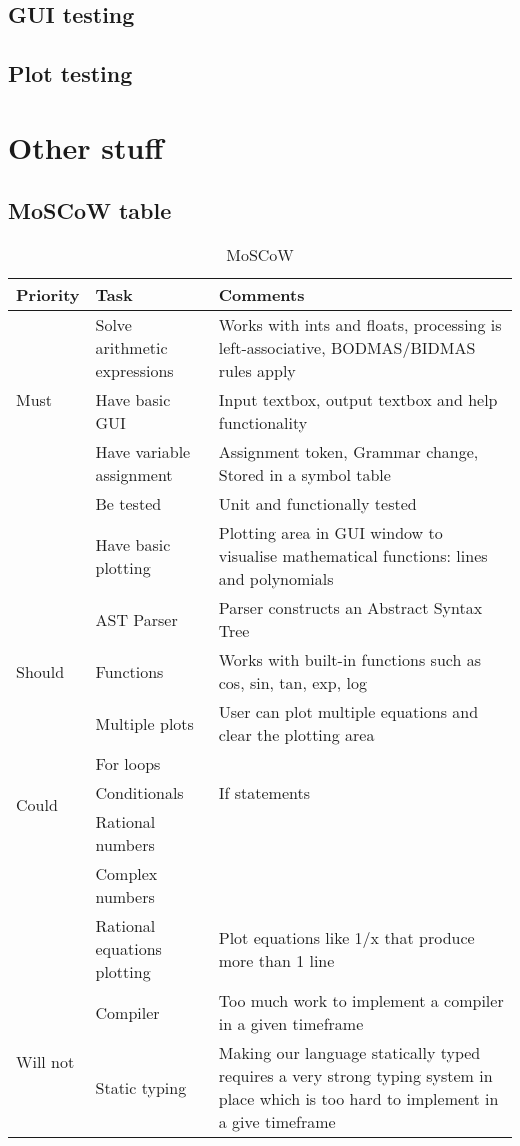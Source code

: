 \documentclass[a4paper, oneside, 11pt]{report}
\begin{document}
\section{GUI testing}

\section{Plot testing}

\chapter{Other stuff}
\section{MoSCoW table}
\label{appendix:moscow}
\begin{table}[h]
\caption{MoSCoW}
\begin{center}
\begin{tabular}{|p{1in}|p{2in}|p{2.5in}|} \hline
Priority & Task & Comments \\ \hline \hline
\multirow{3}{1in}{Must}
& Solve arithmetic expressions & Works with ints and floats, processing is left-associative, BODMAS/BIDMAS rules apply \\ \cline{2-3}
& Have basic GUI & Input textbox, output textbox and help functionality \\ \cline{2-3}
& Have variable assignment & Assignment token, Grammar change, Stored in a symbol table \\ \cline{2-3}
& Be tested & Unit and functionally tested \\ \cline{2-3}
& Have basic plotting & Plotting area in GUI window to visualise mathematical functions: lines and polynomials \\ \hline \hline
\multirow{3}{1in}{Should}
& AST Parser & Parser constructs an Abstract Syntax Tree \\ \cline{2-3}
& Functions & Works with built-in functions such as cos, sin, tan, exp, log  \\ \cline{2-3}
& Multiple plots & User can plot multiple equations and clear the plotting area \\ \hline \hline
\multirow{3}{1in}{Could}
& For loops & \\ \cline{2-3}
& Conditionals & If statements \\ \cline{2-3}
& Rational numbers & \\ \cline{2-3}
& Complex numbers & \\ \cline{2-3}
& Rational equations plotting & Plot equations like 1/x that produce more than 1 line \\ \hline \hline
\multirow{3}{1in}{Will not}
& Compiler & Too much work to implement a compiler in a given timeframe \\ \cline{2-3}
& Static typing & Making our language statically typed requires a very strong typing system in place which is too hard to implement in a give timeframe \\ \hline
\end{tabular}
\label{Table1}
\end{center}
\end{table}
\end{document}
